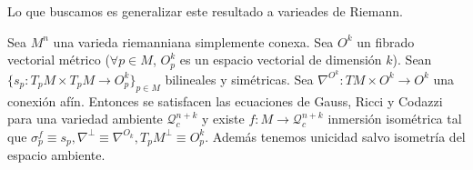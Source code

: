 \documentclass[GSR.tex]{subfiles}
\begin{document}
Lo que buscamos es generalizar este resultado a varieades de Riemann. 

\begin{teorema}
Sea $M^{n}$ una varieda riemanniana simplemente conexa. Sea $O^k$ un fibrado vectorial métrico ($\forall p\in M$, $O^k_p$ es un espacio vectorial de dimensión $k$). Sean $\{s_p:T_pM\times T_pM\to O_p^k\}_{p\in M}$ bilineales y simétricas. Sea $\nabla^{O^k}:TM\times O^k\to O^k$ una conexión afín. Entonces se satisfacen las ecuaciones de Gauss, Ricci y Codazzi para una variedad ambiente $\mathcal{Q}_c^{n+k}$ y existe $f:M\to \mathcal{Q}_c^{n+k}$ inmersión isométrica tal que $\sigma_p^f\equiv s_p, \nabla^\perp\equiv\nabla^{O_k}, T_pM^\perp\equiv O_p^k$. Además tenemos unicidad salvo isometría del espacio ambiente. 
\end{teorema}
\end{document}
